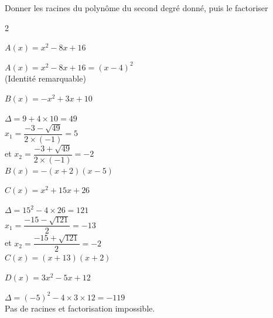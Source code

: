 \documentclass[12pt,a4paper]{article}  %
\begin{document}
Donner les racines du polynôme du second degré donné, puis le factoriser
\begin{multicols}{2}
\begin{enumMet}
    \item $A(x)=x^{2}-8 x+16$ \quad {}
    \begin{corrBox}
    	$A(x)=x^{2}-8x+16=(x-4)^2$\\
    	(Identité remarquable)
    \end{corrBox}
    \item {} $B(x)=-x^{2}+3 x+10$ \quad {}
    \begin{corrBox}
    	$\Delta=9+4\times10=49$\\
    	$x_1=\dfrac{-3-\sqrt{49}}{2\times(-1)}=5$\\
    	et $x_2=\dfrac{-3+\sqrt{49}}{2\times(-1)}=-2$\\
    	$B(x)=-(x+2)(x-5)$
    \end{corrBox}
    \item $C(x)=x^{2}+15x+26$ \quad {}
    \begin{corrBox}
    	$\Delta=15^2-4\times26=121$\\
    	$x_1=\dfrac{-15-\sqrt{121}}{2}=-13$\\
    	et $x_2=\dfrac{-15+\sqrt{121}}{2}=-2$\\
    	$C(x)=(x+13)(x+2)$
    \end{corrBox}
    \item $D(x)=3 x^{2}-5 x+12$ \quad {}
    \begin{corrBox}
    	$\Delta=(-5)^2-4\times3\times12=-119$\\
    	Pas de racines et factorisation impossible.
    \end{corrBox}
\end{enumMet}
\end{multicols}

\vspace{-0.3cm}
\end{document}
